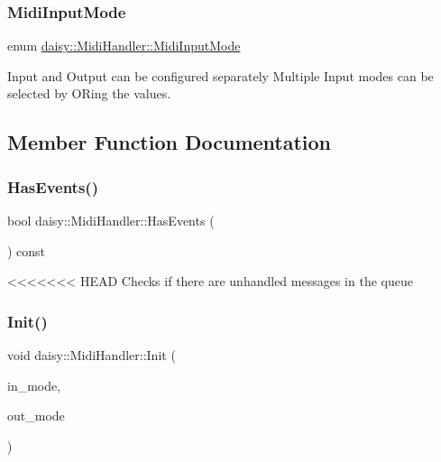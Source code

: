 \subsubsection{\texorpdfstring{Midi\+Input\+Mode}{MidiInputMode}}
{\footnotesize\ttfamily enum \hyperlink{classdaisy_1_1_midi_handler_acc2df91e9c18571da6edecaec4fbc7fe}{daisy\+::\+Midi\+Handler\+::\+Midi\+Input\+Mode}}

Input and Output can be configured separately Multiple Input modes can be selected by OR\textquotesingle{}ing the values. 

\subsection{Member Function Documentation}
\mbox{\label{classdaisy_1_1_midi_handler_a8c0750453834eae67cf1c1ae6544d5bb}} 
\subsubsection{\texorpdfstring{Has\+Events()}{HasEvents()}}
{\footnotesize\ttfamily bool daisy\+::\+Midi\+Handler\+::\+Has\+Events (\begin{DoxyParamCaption}{ }\end{DoxyParamCaption}) const\hspace{0.3cm}{\ttfamily [inline]}}

<<<<<<< HEAD
Checks if there are unhandled messages in the queue \mbox{\label{classdaisy_1_1_midi_handler_a1279f2e3e67adb676a0fe550a9c22221}} 
\subsubsection{\texorpdfstring{Init()}{Init()}}
{\footnotesize\ttfamily void daisy\+::\+Midi\+Handler\+::\+Init (\begin{DoxyParamCaption}\item[{\hyperlink{classdaisy_1_1_midi_handler_acc2df91e9c18571da6edecaec4fbc7fe}{Midi\+Input\+Mode}}]{in\+\_\+mode,  }\item[{Midi\+Output\+Mode}]{out\+\_\+mode }\end{DoxyParamCaption})}

